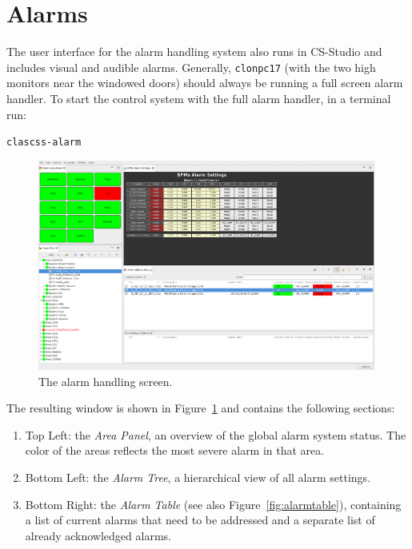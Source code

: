 \documentclass[amsmath,amssymb,notitlepage,11pt]{revtex4}
\begin{document}
\section{Alarms}

The user interface for the alarm handling system also runs in CS-Studio and includes visual and audible alarms.  Generally, \texttt{clonpc17} (with the two high monitors near the windowed doors) should always be running a full screen alarm handler.  To start the control system with the full alarm handler, in a terminal run:
\begin{center}\texttt{clascss-alarm}\end{center}
\begin{figure}[htpb]\centering
  \includegraphics[width=0.99\textwidth]{pics/clas12alarm3}
  \caption{The alarm handling screen.\label{fig:alarmhandler}}
\end{figure}
The resulting window is shown in Figure~\ref{fig:alarmhandler} and contains the following sections:
\begin{enumerate}
    \item Top Left:  the {\em Area Panel}, an overview of the global alarm system status.  The color of the areas reflects the most severe alarm in that area.
    \item Bottom Left:  the {\em Alarm Tree}, a hierarchical view of all alarm settings.
    \item  Bottom Right:  the {\em Alarm Table} (see also Figure~\ref{fig:alarmtable}), containing a list of current alarms that need to be addressed and a separate list of already acknowledged alarms.
\end{enumerate}
\end{document}
